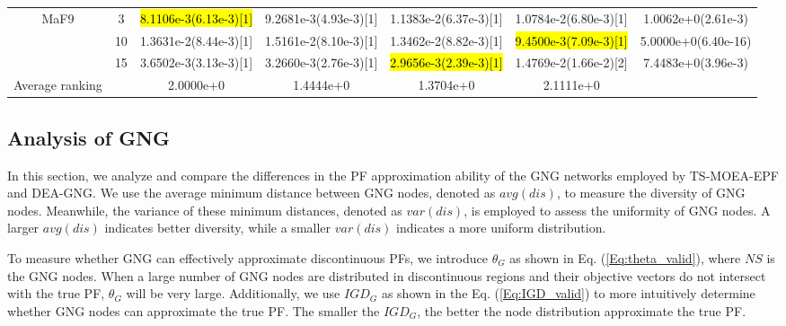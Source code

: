 \documentclass[a4paper,fleqn]{cas-dc}
\newcommand{\highlight}[1]{
	\begingroup
	\sethlcolor{Seashell}%
	\hl{#1}%
	\endgroup
}
\begin{document}
\begin{sloppypar}
\begin{table}[ht]
{\begin{tabular}{ccccccc}
				
				
				
				
				\multirow{3}{*}{MaF9}&3 &\highlight{8.1106e-3(6.13e-3)[1]}	&9.2681e-3(4.93e-3)[1]	&1.1383e-2(6.37e-3)[1]	&1.0784e-2(6.80e-3)[1] &1.0062e+0(2.61e-3)
				\\
				\multirow{3}{*}{~}&10   &1.3631e-2(8.44e-3)[1]	&1.5161e-2(8.10e-3)[1]	&1.3462e-2(8.82e-3)[1]	&\highlight{9.4500e-3(7.09e-3)[1]} &5.0000e+0(6.40e-16)\\
				\multirow{3}{*}{~}&15 	&3.6502e-3(3.13e-3)[1]	&3.2660e-3(2.76e-3)[1]	&\highlight{2.9656e-3(2.39e-3)[1]}	&1.4769e-2(1.66e-2)[2] 	&7.4483e+0(3.96e-3)\\
				\hline
				Average ranking &~ &2.0000e+0 &1.4444e+0	  & 1.3704e+0	&2.1111e+0	   &~	  \\
				\bottomrule           
			\end{tabular}
		}
		
	\end{table}
	
	\subsection{{Analysis of GNG}}
	\par {In this section, we analyze and compare the differences in the PF approximation ability of the GNG networks employed by TS-MOEA-EPF and DEA-GNG. We use the average minimum distance between GNG nodes, denoted as $avg(dis)$, to measure the diversity of GNG nodes. Meanwhile, the variance of these minimum distances, denoted as $var(dis)$, is employed to assess the uniformity of GNG nodes. A larger  $avg(dis)$  indicates better  diversity, while a smaller $var(dis)$  indicates a more uniform  distribution. }
	\par {To measure whether GNG can effectively approximate discontinuous PFs, we introduce $\theta_{G}$ as shown in Eq. (\ref{Eq:theta_valid}), where $NS$ is the GNG nodes. When a large number of GNG nodes are distributed in discontinuous regions and their objective vectors do not intersect with the true PF,  $\theta_{G}$ will be very large. Additionally, we use $IGD_G$ as shown in the Eq. (\ref{Eq:IGD_valid}) to more intuitively determine whether GNG nodes can approximate the true PF. The smaller the $IGD_{G}$, the better the node distribution approximate the true PF.}
	

\end{sloppypar}
\end{document}
